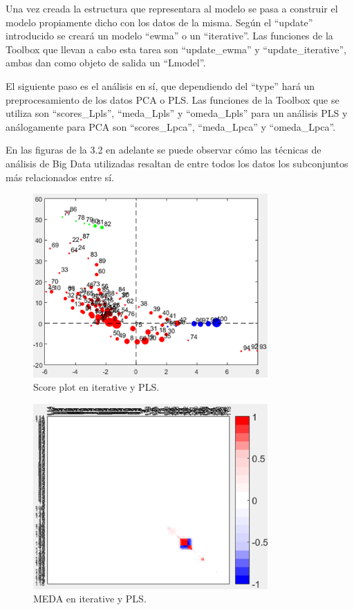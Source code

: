 \bigskip

Una vez creada la estructura que representara al modelo se pasa a construir el modelo propiamente dicho con los datos de la misma. Según el “update” introducido se creará un modelo “ewma” o un “iterative”. Las funciones de la Toolbox que llevan a cabo esta tarea son “update\_ewma” y “update\_iterative”, ambas dan como objeto de salida un “Lmodel”. 
\bigskip

El siguiente paso es el análisis en sí, que dependiendo del “type” hará un preprocesamiento de los datos PCA o PLS. Las funciones de la Toolbox que se utiliza son “scores\_Lpls”, “meda\_Lpls” y “omeda\_Lpls” para un análisis PLS y análogamente para PCA son “scores\_Lpca”, “meda\_Lpca” y “omeda\_Lpca”. 
\bigskip

En las figuras de la 3.2 en adelante se puede observar cómo las técnicas de análisis de Big Data utilizadas resaltan de entre todos los datos los subconjuntos más relacionados entre sí.
\bigskip

\begin{figure}[H]
\centering
\includegraphics[width=0.8\textwidth]{imagenes/figuras/3_2.png}
\caption{Score plot en iterative y PLS.}
\end{figure}

\begin{figure}[H]
\centering
\includegraphics[width=0.8\textwidth]{imagenes/figuras/3_3.png}
\caption{MEDA en iterative y PLS.}
\end{figure}

